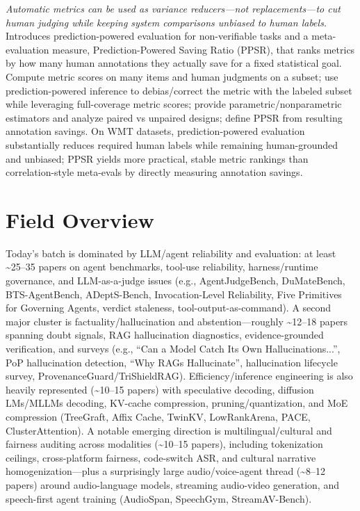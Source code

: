 \documentclass[12pt,letterpaper]{article}
\begin{document}
{\small\textit{Automatic metrics can be used as variance reducers---not replacements---to cut human judging while keeping system comparisons unbiased to human labels.}}\\[1pt]
{\footnotesize Introduces prediction-powered evaluation for non-verifiable tasks and a meta-evaluation measure, Prediction-Powered Saving Ratio (PPSR), that ranks metrics by how many human annotations they actually save for a fixed statistical goal. Compute metric scores on many items and human judgments on a subset; use prediction-powered inference to debias/correct the metric with the labeled subset while leveraging full-coverage metric scores; provide parametric/nonparametric estimators and analyze paired vs unpaired designs; define PPSR from resulting annotation savings. On WMT datasets, prediction-powered evaluation substantially reduces required human labels while remaining human-grounded and unbiased; PPSR yields more practical, stable metric rankings than correlation-style meta-evals by directly measuring annotation savings.}

\medskip



\section*{Field Overview}
{\footnotesize Today's batch is dominated by LLM/agent reliability and evaluation: at least \textasciitilde{}25--35 papers on agent benchmarks, tool-use reliability, harness/runtime governance, and LLM-as-a-judge issues (e.g., AgentJudgeBench, DuMateBench, BTS-AgentBench, ADeptS-Bench, Invocation-Level Reliability, Five Primitives for Governing Agents, verdict staleness, tool-output-as-command). A second major cluster is factuality/hallucination and abstention---roughly \textasciitilde{}12--18 papers spanning doubt signals, RAG hallucination diagnostics, evidence-grounded verification, and surveys (e.g., ``Can a Model Catch Its Own Hallucinations...'', PoP hallucination detection, ``Why RAGs Hallucinate'', hallucination lifecycle survey, ProvenanceGuard/TriShieldRAG). Efficiency/inference engineering is also heavily represented (\textasciitilde{}10--15 papers) with speculative decoding, diffusion LMs/MLLMs decoding, KV-cache compression, pruning/quantization, and MoE compression (TreeGraft, Affix Cache, TwinKV, LowRankArena, PACE, ClusterAttention). A notable emerging direction is multilingual/cultural and fairness auditing across modalities (\textasciitilde{}10--15 papers), including tokenization ceilings, cross-platform fairness, code-switch ASR, and cultural narrative homogenization---plus a surprisingly large audio/voice-agent thread (\textasciitilde{}8--12 papers) around audio-language models, streaming audio-video generation, and speech-first agent training (AudioSpan, SpeechGym, StreamAV-Bench).}
\end{document}
